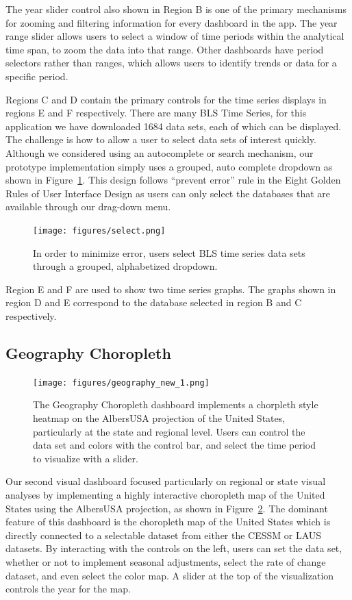 \documentclass{sigchi}
\begin{document}
{The year slider control also shown in Region B is one of the primary mechanisms for zooming and filtering information for every dashboard in the app. The year range slider allows users to select a window of time periods within the analytical time span, to zoom the data into that range. Other dashboards have period selectors rather than ranges, which allows users to identify trends or data for a specific period.

Regions C and D contain the primary controls for the time series displays in regions E and F respectively. There are many BLS Time Series, for this application we have downloaded 1684 data sets, each of which can be displayed. The challenge is how to allow a user to select data sets of interest quickly. Although we considered using an autocomplete or search mechanism, our prototype implementation simply uses a grouped, auto complete dropdown as shown in Figure~\ref{fig:select}. This design follows ``prevent error'' rule in the Eight Golden Rules of User Interface Design \cite{shneiderman_eight_????} as users can only select the databases that are available through our drag-down menu.

\begin{figure}[h]
    \centering
    \texttt{[image: figures/select.png]}
    \caption{In order to minimize error, users select BLS time series data sets through a grouped, alphabetized dropdown.}
    \label{fig:select}
\end{figure}

Region E and F are used to show two time series graphs. The graphs shown in region D and E correspond to the  database selected in region B and C respectively.

\subsection{Geography Choropleth}

\begin{figure}[!ht]
    \centering
    \texttt{[image: figures/geography\_new\_1.png]}
    \caption{The Geography Choropleth dashboard implements a chorpleth style heatmap on the AlbersUSA projection of the United States, particularly at the state and regional level. Users can control the data set and colors with the control bar, and select the time period to visualize with a slider.}
    \label{fig:Geography}
\end{figure}

Our second visual dashboard focused particularly on regional or state visual analyses by implementing a highly interactive choropleth map of the United States using the AlbersUSA projection, as shown in Figure~\ref{fig:Geography}. The dominant feature of this dashboard is the choropleth map of the United States which is directly connected to a selectable dataset from either the CESSM or LAUS datasets. By interacting with the controls on the left, users can set the data set, whether or not to implement seasonal adjustments, select the rate of change dataset, and even select the color map. A slider at the top of the visualization controls the year for the map.

}
\end{document}
